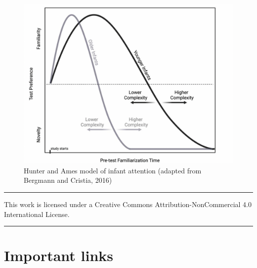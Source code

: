 \documentclass[
]{book}
\begin{document}
\begin{figure}

{\centering \includegraphics[width=0.75\linewidth]{images/HunterAmesFig} 

}

\caption{Hunter and Ames model of infant attention (adapted from Bergmann and Cristia, 2016)}\label{fig:unnamed-chunk-1}
\end{figure}

\begin{center}\rule{0.5\linewidth}{0.5pt}\end{center}

This work is licensed under a Creative Commons Attribution-NonCommercial 4.0 International License.

\begin{center}\rule{0.5\linewidth}{0.5pt}\end{center}

\section*{Important links}\label{important-links}
\end{document}
